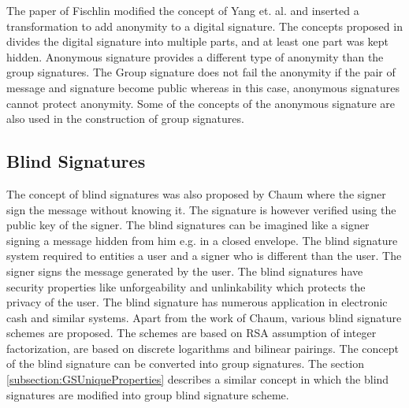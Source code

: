 The paper of Fischlin \cite{fischlin2007anonymous} modified the concept of Yang et. al. and inserted a transformation to add anonymity to a digital signature. The concepts proposed in \cite{bellare2009partial, saraswat2009anonymous, zhang2008strong} divides the digital signature into multiple parts, and at least one part was kept hidden. Anonymous signature provides a different type of anonymity than the group signatures. The Group signature does not fail the anonymity if the pair of message and signature become public whereas in this case, anonymous signatures cannot protect anonymity. Some of the concepts of the anonymous signature are also used in the construction of group signatures.

\subsection{Blind Signatures}
The concept of blind signatures was also proposed by Chaum \cite{chaum1983blind} where the signer sign the message without knowing it. The signature is however verified using the public key of the signer. The blind signatures can be imagined like a signer signing a message hidden from him e.g. in a closed envelope. The blind signature system required to entities a user and a signer who is different than the user. The signer signs the message generated by the user. The blind signatures have security properties like unforgeability and unlinkability which protects the privacy of the user. The blind signature has numerous application in electronic cash and similar systems. Apart from the work of Chaum, various blind signature schemes are proposed. The schemes \cite{camenisch2004efficient, kiayias2006concurrent, kiayias2008equivocal} are based on RSA assumption of integer factorization, \cite{pointcheval2000security, abe2001secure, abe2010structure, boldyreva2003threshold} are based on discrete logarithms and bilinear pairings. The concept of the blind signature can be converted into group signatures. The section \ref{subsection:GSUniqueProperties} describes a similar concept in which the blind signatures are modified into group blind signature scheme.

